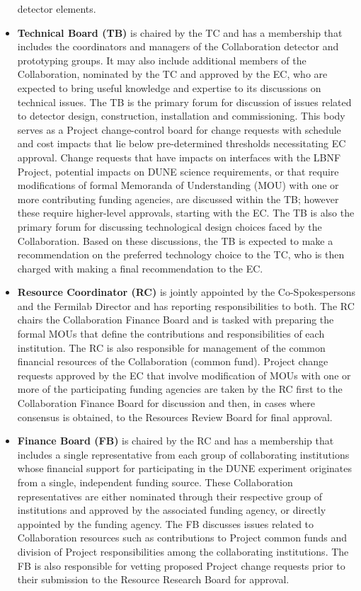 \begin{itemize}
detector elements.
\item \textbf{Technical Board (TB)} is chaired by the TC and has a membership that includes the coordinators and managers of the Collaboration detector and prototyping groups.  It may also include additional members of the Collaboration, nominated by the TC and approved by the EC, who are expected to bring useful knowledge and expertise to its discussions on technical issues.  The TB is the primary %
forum for discussion of issues related to %
detector design, construction, installation and commissioning. %
This body serves as a Project change-control board for change requests with schedule and cost impacts that lie below pre-determined thresholds necessitating EC approval.  Change requests that have impacts on interfaces with the LBNF Project, %
potential impacts on DUNE science requirements, or that require modifications of formal Memoranda of Understanding (MOU) with one or more 
contributing funding agencies, are discussed within the TB; however these require higher-level approvals, starting with the EC.  The TB is also the primary forum for discussing technological design choices faced by the Collaboration.  Based on these discussions, the TB is expected to make a recommendation on the preferred technology choice to the TC, who is then charged with making a final recommendation to the EC. %
\item \textbf{Resource Coordinator (RC)} is jointly appointed by the Co-Spokespersons and the Fermilab Director and has reporting responsibilities to both.  The RC chairs the Collaboration Finance Board and is tasked with preparing the formal MOUs that define the contributions and responsibilities of each institution.  The RC is also responsible for management of the common financial resources of the Collaboration (common fund).  Project change requests approved by the EC that involve modification of MOUs with one or more of the participating funding agencies are taken by the RC first to the Collaboration Finance Board for discussion and then, in cases where consensus is obtained, to the Resources Review Board for final approval.
\item \textbf{Finance Board (FB)} is chaired by the RC and has a membership that includes a single representative from each group of collaborating institutions whose financial support for participating in the DUNE experiment originates from a single, independent funding source.  These Collaboration representatives are either nominated through their respective group of institutions and approved by the associated funding agency, or directly appointed by the funding agency.  The FB discusses issues related to Collaboration resources such as contributions to Project common funds and division of Project responsibilities among the collaborating institutions.  The FB is also responsible for vetting proposed Project change requests prior to their submission to the Resource Research Board for approval.

\end{itemize}
